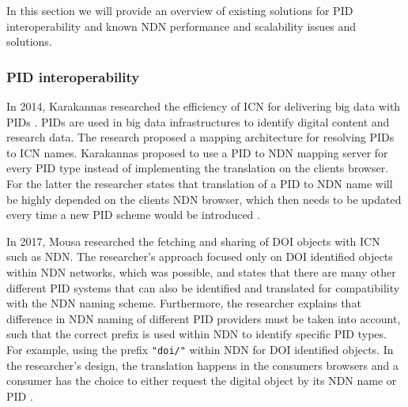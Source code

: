 
In this section we will provide an overview of existing solutions for PID interoperability and known NDN performance and scalability issues and solutions.

\subsubsection{PID interoperability}
\label{introduction-pid}
In 2014, Karakannas researched the efficiency of ICN for delivering big data with PIDs \cite{icn-bd}. PIDs are used in big data infrastructures to identify digital content and research data. The research proposed a mapping architecture for resolving PIDs to ICN names. Karakannas proposed to use a PID to NDN mapping server for every PID type instead of implementing the translation on the clients browser. For the latter the researcher states that translation of a PID to NDN name will be highly depended on the clients NDN browser, which then needs to be updated every time a new PID scheme would be introduced \cite{icn-bd}.

In 2017, Mousa researched the fetching and sharing of DOI objects with ICN such as NDN. 
The researcher's approach focused only on DOI identified objects within NDN networks, which was possible, and states that there are many other different PID systems that can also be identified and translated for compatibility with the NDN naming scheme. Furthermore, the researcher explains that difference in NDN naming of different PID providers must be taken into account, such that the correct prefix is used within NDN to identify specific PID types. For example, using the prefix \texttt{"doi/"} within NDN for DOI identified objects.
In the researcher's design, the translation happens in the consumers browsers and a consumer has the choice to either request the digital object by its NDN name or PID \cite{ndn-app-aware}.

